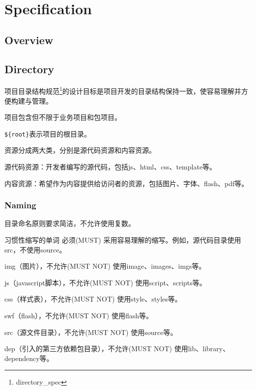 \part{Specification}



\chapter{Overview}




\chapter{Directory}


项目目录结构规范\footnote{directory\_spec}的设计目标是项目开发的目录结构保持一致，使容易理解并方便构建与管理。


\begin{compactitem}
\item 项目包含但不限于业务项目和包项目。
\item \texttt{\$\{root\}}表示项目的根目录。
\end{compactitem}


资源分成两大类，分别是源代码资源和内容资源。

\begin{compactenum}
\item 源代码资源：开发者编写的源代码，包括js、html、css、template等。
\item 内容资源：希望作为内容提供给访问者的资源，包括图片、字体、flash、pdf等。
\end{compactenum}

\section{Naming}


目录命名原则要求简洁，不允许使用复数。

习惯性缩写的单词 必须(MUST) 采用容易理解的缩写。例如，源代码目录使用src，不使用source。

\begin{compactitem}
\item img（图片），不允许(MUST NOT) 使用image、images、imgs等。
\item js（javascript脚本），不允许(MUST NOT) 使用script、scripts等。
\item css（样式表），不允许(MUST NOT) 使用style、styles等。
\item swf（flash），不允许(MUST NOT) 使用flash等。
\item src（源文件目录），不允许(MUST NOT) 使用source等。
\item dep（引入的第三方依赖包目录），不允许(MUST NOT) 使用lib、library、dependency等。
\end{compactitem}

